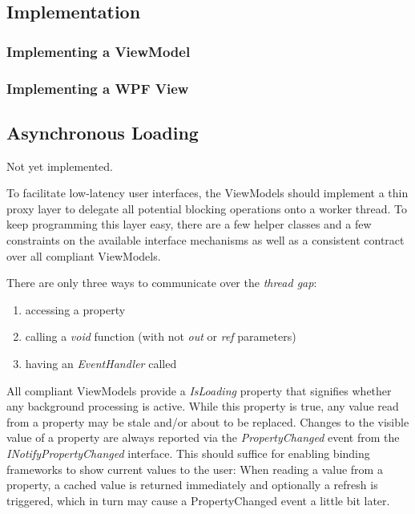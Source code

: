 \subsection{Implementation}

\subsubsection{Implementing a ViewModel}

\subsubsection{Implementing a WPF View}



\subsection{Asynchronous Loading}

\begin{note}
Not yet implemented.
\end{note}

To facilitate low-latency user interfaces, the ViewModels should implement a
thin proxy layer to delegate all potential blocking operations onto a worker
thread. To keep programming this layer easy, there are a few helper classes and
a few constraints on the available interface mechanisms as well as a consistent
contract over all compliant ViewModels.

There are only three ways to communicate over the \emph{thread gap}:
\begin{enumerate}
\item{accessing a property}
\item{calling a \emph{void} function (with not \emph{out} or \emph{ref} parameters)}
\item{having an \emph{EventHandler} called}
\end{enumerate}

All compliant ViewModels provide a \emph{IsLoading} property that signifies
whether any background processing is active. While this property is true, any
value read from a property may be stale and/or about to be replaced. Changes to
the visible value of a property are always reported via the
\emph{PropertyChanged} event from the \emph{INotifyPropertyChanged} interface.
This should suffice for enabling binding frameworks to show current values to
the user: When reading a value from a property, a cached value is returned
immediately and optionally a refresh is triggered, which in turn may cause a
PropertyChanged event a little bit later.

